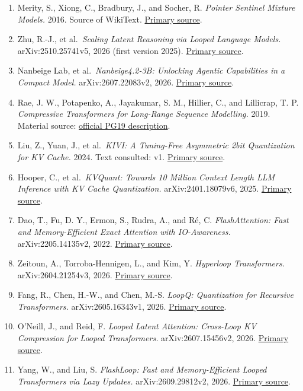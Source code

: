 \documentclass[10pt,a4paper]{article}
\begin{document}
\begin{enumerate}
\def\labelenumi{\arabic{enumi}.}
\item
  Merity, S., Xiong, C., Bradbury, J., and Socher, R. \emph{Pointer Sentinel Mixture Models.} 2016. Source of WikiText. \href{https://arxiv.org/abs/1609.07843}{Primary source}.
\item
  Zhu, R.-J., et al.~\emph{Scaling Latent Reasoning via Looped Language Models.} arXiv:2510.25741v5, 2026 (first version 2025). \href{https://arxiv.org/abs/2510.25741v5}{Primary source}.
\item
  Nanbeige Lab, et al.~\emph{Nanbeige4.2-3B: Unlocking Agentic Capabilities in a Compact Model.} arXiv:2607.22083v2, 2026. \href{https://arxiv.org/abs/2607.22083v2}{Primary source}.
\item
  Rae, J. W., Potapenko, A., Jayakumar, S. M., Hillier, C., and Lillicrap, T. P. \emph{Compressive Transformers for Long-Range Sequence Modelling.} 2019. Material source: \href{https://github.com/google-deepmind/pg19}{official PG19 description}.
\item
  Liu, Z., Yuan, J., et al.~\emph{KIVI: A Tuning-Free Asymmetric 2bit Quantization for KV Cache.} 2024. Text consulted: v1. \href{https://arxiv.org/html/2402.02750v1}{Primary source}.
\item
  Hooper, C., et al.~\emph{KVQuant: Towards 10 Million Context Length LLM Inference with KV Cache Quantization.} arXiv:2401.18079v6, 2025. \href{https://arxiv.org/html/2401.18079v6}{Primary source}.
\item
  Dao, T., Fu, D. Y., Ermon, S., Rudra, A., and Ré, C. \emph{FlashAttention: Fast and Memory-Efficient Exact Attention with IO-Awareness.} arXiv:2205.14135v2, 2022. \href{https://arxiv.org/abs/2205.14135v2}{Primary source}.
\item
  Zeitoun, A., Torroba-Hennigen, L., and Kim, Y. \emph{Hyperloop Transformers.} arXiv:2604.21254v3, 2026. \href{https://arxiv.org/html/2604.21254v3}{Primary source}.
\item
  Fang, R., Chen, H.-W., and Chen, M.-S. \emph{LoopQ: Quantization for Recursive Transformers.} arXiv:2605.16343v1, 2026. \href{https://arxiv.org/html/2605.16343v1}{Primary source}.
\item
  O'Neill, J., and Reid, F. \emph{Looped Latent Attention: Cross-Loop KV Compression for Looped Transformers.} arXiv:2607.15456v2, 2026. \href{https://arxiv.org/html/2607.15456v2}{Primary source}.
\item
  Yang, W., and Liu, S. \emph{FlashLoop: Fast and Memory-Efficient Looped Transformers via Lazy Updates.} arXiv:2609.29812v2, 2026. \href{https://arxiv.org/html/2609.29812v2}{Primary source}.

\end{enumerate}
\end{document}
